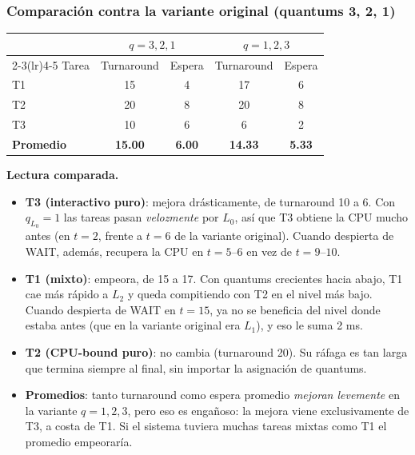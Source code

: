 \documentclass[11pt,a4paper]{article}
\begin{document}
\subsubsection*{Comparación contra la variante original (quantums 3, 2, 1)}

\begin{center}
\small
\begin{tabular}{@{}lcccc@{}}
\toprule
 & \multicolumn{2}{c}{$q = 3, 2, 1$} & \multicolumn{2}{c}{$q = 1, 2, 3$} \\
 \cmidrule(lr){2-3}\cmidrule(lr){4-5}
Tarea & Turnaround & Espera & Turnaround & Espera \\
\midrule
T1 & 15 & 4 & 17 & 6 \\
T2 & 20 & 8 & 20 & 8 \\
T3 & 10 & 6 &  6 & 2 \\
\midrule
\textbf{Promedio} & \textbf{15.00} & \textbf{6.00} & \textbf{14.33} & \textbf{5.33} \\
\bottomrule
\end{tabular}
\end{center}

\textbf{Lectura comparada.}

\begin{itemize}[leftmargin=*]
    \item \textbf{T3 (interactivo puro)}: mejora drásticamente, de
        turnaround 10 a 6. Con $q_{L_0} = 1$ las tareas pasan
        \emph{velozmente} por $L_0$, así que T3 obtiene la CPU mucho
        antes (en $t = 2$, frente a $t = 6$ de la variante original).
        Cuando despierta de WAIT, además, recupera la CPU en
        $t = 5$--$6$ en vez de $t = 9$--$10$.
    \item \textbf{T1 (mixto)}: empeora, de 15 a 17. Con quantums
        crecientes hacia abajo, T1 cae más rápido a $L_2$ y queda
        compitiendo con T2 en el nivel más bajo. Cuando despierta de
        WAIT en $t = 15$, ya no se beneficia del nivel donde estaba
        antes (que en la variante original era $L_1$), y eso le suma
        2 ms.
    \item \textbf{T2 (CPU-bound puro)}: no cambia (turnaround 20). Su
        ráfaga es tan larga que termina siempre al final, sin importar
        la asignación de quantums.
    \item \textbf{Promedios}: tanto turnaround como espera promedio
        \emph{mejoran levemente} en la variante $q = 1, 2, 3$, pero
        eso es engañoso: la mejora viene exclusivamente de T3, a
        costa de T1. Si el sistema tuviera muchas tareas mixtas como
        T1 el promedio empeoraría.
\end{itemize}
\end{document}
